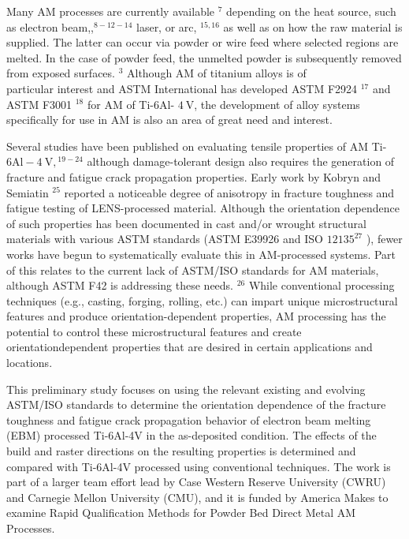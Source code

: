 \documentclass[10pt]{article}
\begin{document}
Many AM processes are currently available ${ }^{7}$ depending on the heat source, such as electron beam,,${ }^{8-12-14}$ laser, or arc, ${ }^{15,16}$ as well as on how the raw material is supplied. The latter can occur via powder or wire feed where selected regions are melted. In the case of powder feed, the unmelted powder is subsequently removed from exposed surfaces. ${ }^{3}$ Although AM of titanium alloys is of\\
particular interest and ASTM International has developed ASTM F2924 ${ }^{17}$ and ASTM F3001 ${ }^{18}$ for AM of Ti-6Al- $4 \mathrm{~V}$, the development of alloy systems specifically for use in AM is also an area of great need and interest.

Several studies have been published on evaluating tensile properties of $\mathrm{AM}$ Ti- $6 \mathrm{Al}-4 \mathrm{~V},{ }^{19-24}$ although damage-tolerant design also requires the generation of fracture and fatigue crack propagation properties. Early work by Kobryn and Semiatin ${ }^{25}$ reported a noticeable degree of anisotropy in fracture toughness and fatigue testing of LENS-processed material. Although the orientation dependence of such properties has been documented in cast and/or wrought structural materials with various ASTM standards (ASTM E39926 and ISO $12135^{27}$ ), fewer works have begun to systematically evaluate this in AM-processed systems. Part of this relates to the current lack of ASTM/ISO standards for AM materials, although ASTM F42 is addressing these needs. ${ }^{26}$ While conventional processing techniques (e.g., casting, forging, rolling, etc.) can impart unique microstructural features and produce orientation-dependent properties, AM processing has the potential to control these microstructural features and create orientationdependent properties that are desired in certain applications and locations.

This preliminary study focuses on using the relevant existing and evolving ASTM/ISO standards to determine the orientation dependence of the fracture toughness and fatigue crack propagation behavior of electron beam melting (EBM) processed Ti-6Al-4V in the as-deposited condition. The effects of the build and raster directions on the resulting properties is determined and compared with Ti-6Al-4V processed using conventional techniques. The work is part of a larger team effort lead by Case Western Reserve University (CWRU) and Carnegie Mellon University (CMU), and it is funded by America Makes to examine Rapid Qualification Methods for Powder Bed Direct Metal AM Processes.
\end{document}
